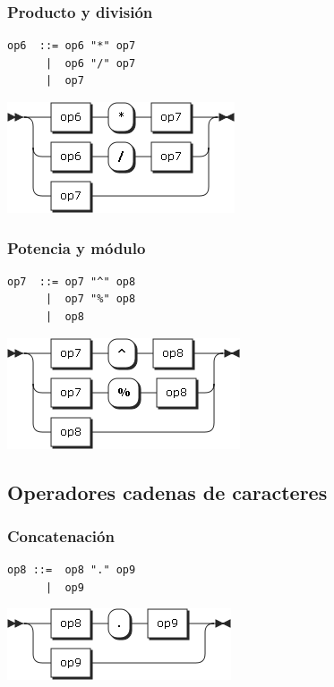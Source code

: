 \subsubsection{Producto y división}
\begin{multicols}{2}
\begin{lstlisting}[style=nonumbers]      
op6  ::= op6 "*" op7
      |  op6 "/" op7
      |  op7
\end{lstlisting}  
\columnbreak	
\begin{center}
\includegraphics[scale=0.5]{diagram/op6.png} \\
\end{center}
\end{multicols}

\subsubsection{Potencia y módulo}
\begin{multicols}{2}
\begin{lstlisting}[style=nonumbers]      
op7  ::= op7 "^" op8
      |  op7 "%" op8
      |  op8
\end{lstlisting}  
\columnbreak	
\begin{center}
\includegraphics[scale=0.5]{diagram/op7.png} \\
\end{center}
\end{multicols}

\subsection{Operadores cadenas de caracteres}
\subsubsection{Concatenación}
\begin{multicols}{2}
\begin{lstlisting}[style=nonumbers]      
op8 ::=  op8 "." op9
      |  op9
\end{lstlisting}  
\columnbreak	
\begin{center}
\includegraphics[scale=0.5]{diagram/op8.png} \\
\end{center}
\end{multicols}
